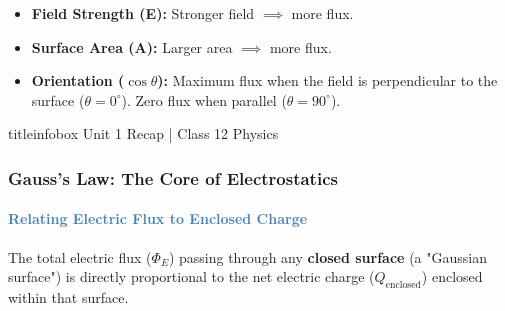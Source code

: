 \begin{frame}
\begin{frame}
\vspace{0.35cm}

\begin{importantbox}
\vspace{0.1cm}
\begin{itemize}
    \item \textbf{Field Strength (E):} Stronger field $\implies$ more flux.
    \item \textbf{Surface Area (A):} Larger area $\implies$ more flux.
    \item \textbf{Orientation ($\cos\theta$):} Maximum flux when the field is perpendicular to the surface ($\theta=0^\circ$). Zero flux when parallel ($\theta=90^\circ$).
\end{itemize}
\vspace{0.1cm}
\end{importantbox}

\vfill

\begin{beamercolorbox}[wd=\textwidth,ht=0.5cm,dp=0.1cm,center]{titleinfobox}
    \small\color{coolgray} Unit 1 Recap | Class 12 Physics
\end{beamercolorbox}
\end{frame}

\begin{frame}
\frametitle{\textsf{\textbf{Gauss's Law:} The Core of Electrostatics}}
\framesubtitle{\textcolor{steelblue}{Relating Electric Flux to Enclosed Charge}}

\vspace{-0.05cm}

\begin{keybox}
\vspace{0.1cm}
The total electric flux ($\Phi_E$) passing through any \textbf{closed surface} (a "Gaussian surface") is directly proportional to the net electric charge ($Q_{\text{enclosed}}$) enclosed within that surface.
\vspace{0.1cm}
\end{keybox}

\vspace{0.35cm}


\end{frame}
\end{frame}

